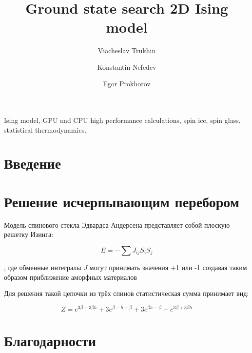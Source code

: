 \documentclass[utf8, babel, sor, jor, amsmath,amssymb, reprint]{elsarticle} %
\begin{document}
\begin{frontmatter}


\title{Ground state search 2D Ising model}

\author[mainaddress, secondaryaddress]{Viacheslav Trukhin}

\author[mainaddress, secondaryaddress]{Konstantin Nefedev}

\author[mainaddress]{Egor Prokhorov}

\address[mainaddress]{Far Eastern Federal University, Vladivostok, Russky Island, 10 Ajax Bay, 690922, the Russian Federation}
\address[secondaryaddress]{Institute of Applied Mathematics, Far Eastern Branch, Russian Academy of Science, Vladivostok, Radio 7, 690041, the Russian Federation}

\begin{abstract}


\end{abstract}


\begin{keyword}
Ising model, GPU and CPU high performance calculations, spin ice, spin glass, statistical thermodynamics.

\end{keyword}


\end{frontmatter}

\linenumbers
\newpage
\tableofcontents

\newpage
\section{Введение}



\section{Решение исчерпывающим перебором}

Модель спинового стекла Эдвардса-Андерсена представляет собой плоскую решетку Изинга:

\begin{equation}
	E = -\sum J_{ij} S_i S_j
	\label{eq:ising_energy}
\end{equation}

, где обменные интегралы $J$ могут принимать значения +1 или -1 создавая таким образом приближение аморфных материалов

Для решения такой цепочки из трёх спинов статистическая сумма
принимает вид:

\begin{equation}
	Z = e^{3\beta - 3\beta h} + 3e^{\beta - h - \beta} + 3e^{\beta h - \beta} + e^{3\beta + 3\beta h}
	\label{eq:stat_3}
\end{equation}

\section{Благодарности}

 


\end{document}
